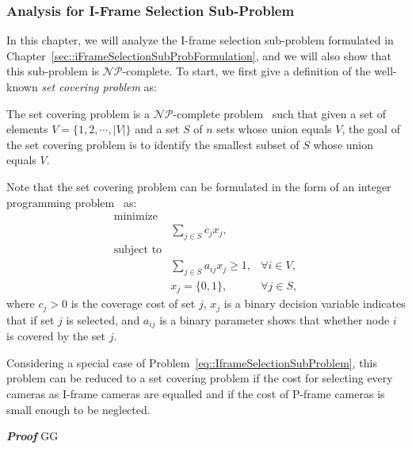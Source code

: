 \subsubsection{Analysis for I-Frame Selection Sub-Problem}
In this chapter, we will analyze the I-frame selection sub-problem formulated in Chapter~\ref{sec::iFrameSelectionSubProbFormulation}, and we will also show that this sub-problem is $\mathcal{NP}$-complete.
To start, we first give a definition of the well-known \emph{set covering problem} as:
\begin{mydef}
The set covering problem is a $\mathcal{NP}$-complete problem~\cite{SetCoveringNPComplete} such that given a set of elements $V = \{1,2,\cdots,|V|\}$ and a set $S$ of $n$ sets whose union equals $V$, the goal of the set covering problem is to identify the smallest subset of $S$ whose union equals $V$.
\end{mydef}
Note that the set covering problem can be formulated in the form of an integer programming problem~\cite{SetCoveringFormulation} as:
\begin{align}
\text{minimize} & & \nonumber \\
 &\sum_{j \in S} c_j x_j, & \nonumber \\
\text{subject to} & & \nonumber \\
 &\sum_{j \in S} a_{ij}x_j \geq 1, &\forall i \in V, \nonumber \\
 &x_{j} = \{0,1\}, &\forall j \in S,
\label{eq::SetCoveringProblemFormualtion}
\end{align}
where $c_j > 0$ is the coverage cost of set $j$, $x_j$ is a binary decision variable indicates that if set $j$ is selected, and $a_{ij}$ is a binary parameter shows that whether node $i$ is covered by the set $j$.
\begin{mylem}
Considering a special case of Problem~\eqref{eq::IframeSelectionSubProblem}, this problem can be reduced to a set covering problem if the cost for selecting every cameras as I-frame cameras are equalled and if the cost of P-frame cameras is small enough to be neglected.
\end{mylem}
\textbf{\emph{Proof}}
GG
%
